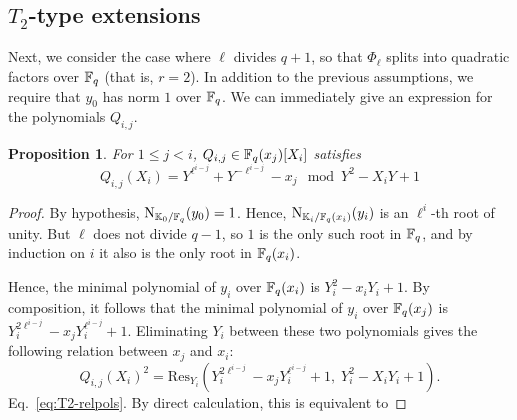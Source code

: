 \documentclass{sig-alternate}
\newtheorem{proposition}[definition]{Proposition}
\begin{document}

\subsection{$T_2$-type extensions}
\label{ssec:T2}

Next, we consider the case where $\ell$ divides $q+1$, so that
$\Phi_\ell$ splits into quadratic factors over $\mathbb{F}_q$ (that is,
$r=2$). In addition to the previous assumptions, we require that $y_0$
has norm $1$ over $\mathbb{F}_q$. We can immediately give an expression for
the polynomials $Q_{i,j}$.

\begin{proposition}
  \label{th:T2-resultant}
  For $1 \le j < i$, $Q_{i,j} \in \mathbb{F}_q(x_{j})[X_i]$ satisfies
  \begin{equation}
    \label{eq:T2-relpols}
    Q_{i,j}(X_i) = Y^{\ell^{i-j}} + Y^{-\ell^{i-j}} - x_j \mod Y^2-X_iY+1
  \end{equation}
\end{proposition}
\begin{proof}
  By hypothesis, $\operatorname{N}_{\mathbb{K}_0/\mathbb{F}_q}(y_0)=1$. Hence,
  $\operatorname{N}_{\mathbb{K}_i/\mathbb{F}_q(x_i)}(y_i)$ is an $\ell^i$-th root of unity. But $\ell$
  does not divide $q-1$, so $1$ is the only such root in $\mathbb{F}_q$, and
  by induction on $i$ it also is the only root in $\mathbb{F}_q(x_i)$.

  Hence, the minimal polynomial of $y_i$ over $\mathbb{F}_q(x_i)$ is $Y_i^2
  -x_i Y_i +1$.  By composition, it follows that the minimal
  polynomial of $y_i$ over $\mathbb{F}_q(x_{j})$ is $Y_i^{2\ell^{i-j}}-x_{j}
  Y_i^{\ell^{i-j}}+1$. Eliminating $Y_i$ between these two polynomials
  gives the following relation between $x_{j}$ and $x_i$:
  \begin{equation*}
    Q_{i,j}(X_i)^2 = \mathrm{Res}_{Y_i}(Y_i^{2\ell^{i-j}}-x_{j}Y_i^{\ell^{i-j}}+1,\; Y_i^2-X_i Y_i+1).
  \end{equation*}
  Eq.~\eqref{eq:T2-relpols}.
  By direct calculation, this is equivalent to
\end{proof}
\end{document}
